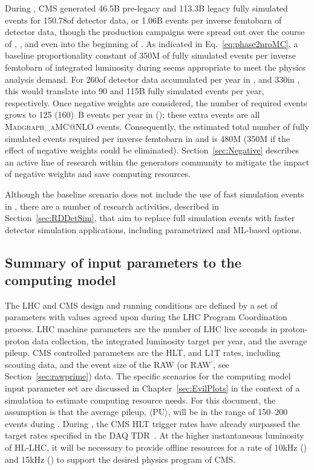 During \RunTwo, CMS generated 46.5\unit{B} pre-legacy and 113.3\unit{B} legacy fully simulated events for 150.78\fbinv of detector data, or 1.06\unit{B} events per inverse femtobarn of detector data, though the production campaigns were spread out over the course of \RunTwo, \LSTwo, and even into the beginning of \RunThree. As indicated in Eq.~\eqref{eq:phase2nroMC}, a baseline proportionality constant of 350\unit{M} of fully simulated events per inverse femtobarn of integrated luminosity during \RunFour seems appropriate to meet the physics analysis demand. For 260\fbinv of detector data accumulated per year in \RunFour, and 330\fbinv in \RunFive, this would translate into 90 and 115\unit{B} fully simulated events per year, respectively. Once negative weights are considered, the number of required events grows to 125 (160)~B events per year in \RunFour (\RunFive); these extra events are all \textsc{Madgraph\_aMC@NLO} events.
Consequently, the estimated total number of fully simulated events required per inverse femtobarn in \RunFour and \RunFive is 480\unit{M} (350\unit{M} if the effect of negative weights could be eliminated). Section~\ref{sec:Negative} describes an active line of research within the generators community to mitigate the impact of negative weights and save computing resources.

Although the baseline scenario does not include the use of fast simulation events in \PhaseTwo, there are a number of research activities, described in Section~\ref{sec:RDDetSim}, that aim to replace full simulation events with faster detector simulation applications, including parametrized and \gls{ML}-based options.

\subsection{Summary of input parameters to the computing model}

The LHC and CMS design and running conditions are defined by a set of parameters with values agreed upon during the LHC Program Coordination process. LHC machine parameters are the number of LHC live seconds in proton-proton data collection, the integrated luminosity target per year, and the average pileup. CMS controlled parameters are the \gls{HLT}, and \gls{L1T} rates, including scouting data, and the event size of the \gls{RAW} (or \gls{RAW}$^\prime$, see Section~\ref{sec:rawprime}) data. The specific scenarios for the computing model input parameter set are discussed in Chapter~\ref{sec:EvilPlots} in the context of a simulation to estimate computing resource needs.  
For this document, the assumption is that the average pileup, $\langle\text{PU}\rangle$, will be in the range of 150--200 events during \PhaseTwo.  During \RunThree, the CMS \gls{HLT} trigger rates have already surpassed the target rates specified in the \gls{DAQ} \gls{TDR}~\cite{CMS:2021DAQTDR}.  At the higher instantaneous luminosity of \gls{HL-LHC}, it will be necessary to provide offline resources for a rate of 10\unit{kHz} (\RunFour) and 15\unit{kHz} (\RunFive) to support the desired physics program of CMS.

